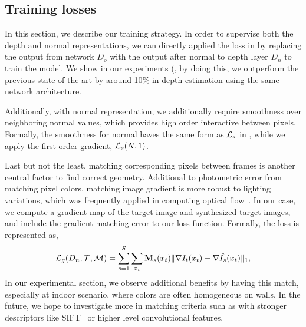 \vspace{-0.7\baselineskip}
\subsection{Training losses}
\label{sub:training_losses}
\vspace{-0.3\baselineskip}

In this section, we describe our training strategy. In order to supervise both the depth and normal representations, we can directly applied the loss in  by replacing the output from network $D_o$ with the output after normal to depth layer $D_n$ to train the model. We show in our experiments (, by doing this, we outperform the previous state-of-the-art by around 10$\%$ in depth estimation using the same network architecture.

Additionally, with normal representation, we additionally require smoothness over neighboring normal values, which provides high order interactive between pixels. Formally, the smoothness for normal haves the same form as ${\mathcal L}_{s}$ in , while we apply the first order gradient, \ie ${\mathcal L}_{s}(N, 1)$. 

Last but not the least, matching corresponding pixels between frames is another central factor to find correct geometry. Additional to photometric error from matching pixel colors, matching image gradient is more robust to lighting variations, which was frequently applied in computing optical flow~\cite{li2017pyramidal}. 
In our case, we compute a gradient map of the target image and synthesized target images, and include the gradient matching error to our loss function. Formally, the loss is represented as,
\begin{equation}
\label{equ:gradient}
{\mathcal L}_{g}(D_n, {\mathcal T}, {\mathcal M}) = \sum_{s=1}^{S}\sum_{x_t}{\mathbf M}_s(x_t)\|\nabla I_t(x_t) - \nabla \hat{I_s}(x_t)\|_1, \nonumber
\end{equation}
In our experimental section, we observe additional benefits by having this match, especially at indoor scenario, where colors are often homogeneous on walls.
In the future, we hope to investigate more in matching criteria such as with stronger descriptors like SIFT~\cite{liu2011sift} or higher level convolutional features.


